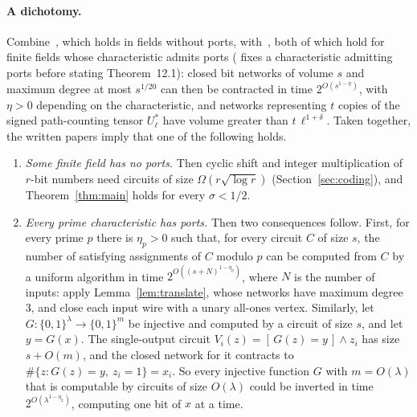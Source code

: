 \documentclass[11pt]{article}
\theoremstyle{definition}
\begin{document}
\paragraph{A dichotomy.} Combine~\cite[Lemma~4.1]{OAI-MM}, which holds in fields without ports, with~\cite[Theorem~12.1 and Theorem~13.1]{OAI-HC}, both of which hold for finite fields whose characteristic admits ports (\cite[Section~12]{OAI-HC} fixes a characteristic admitting ports before stating Theorem~12.1): closed bit networks of volume $s$ and maximum degree at most $s^{1/20}$ can then be contracted in time $2^{O(s^{1-\eta})}$, with $\eta>0$ depending on the characteristic, and networks representing $t$ copies of the signed path-counting tensor $U_\ell^*$ have volume greater than $t\,\ell^{1+\delta}$. Taken together, the written papers imply that one of the following holds.
\begin{enumerate}
\item \emph{Some finite field has no ports.} Then cyclic shift and integer multiplication of $r$-bit numbers need circuits of size $\Omega(r\sqrt{\log r})$ (Section~\ref{sec:coding}), and Theorem~\ref{thm:main} holds for every $\sigma<1/2$.
\item \emph{Every prime characteristic has ports.} Then two consequences follow. First, for every prime $p$ there is $\eta_p>0$ such that, for every circuit $C$ of size $s$, the number of satisfying assignments of $C$ modulo $p$ can be computed from $C$ by a uniform algorithm in time $2^{O((s+N)^{1-\eta_p})}$, where $N$ is the number of inputs: apply Lemma~\ref{lem:translate}, whose networks have maximum degree $3$, and close each input wire with a unary all-ones vertex. Similarly, let $G:\{0,1\}^\lambda\to\{0,1\}^{m}$ be injective and computed by a circuit of size $s$, and let $y=G(x)$. The single-output circuit $V_i(z)=[\,G(z)=y\,]\wedge z_i$ has size $s+O(m)$, and the closed network for it contracts to $\#\{z: G(z)=y,\ z_i=1\} = x_i$. So every injective function $G$ with $m=O(\lambda)$ that is computable by circuits of size $O(\lambda)$ could be inverted in time $2^{O(\lambda^{1-\eta_2})}$, computing one bit of $x$ at a time.


\end{enumerate}
\end{document}
